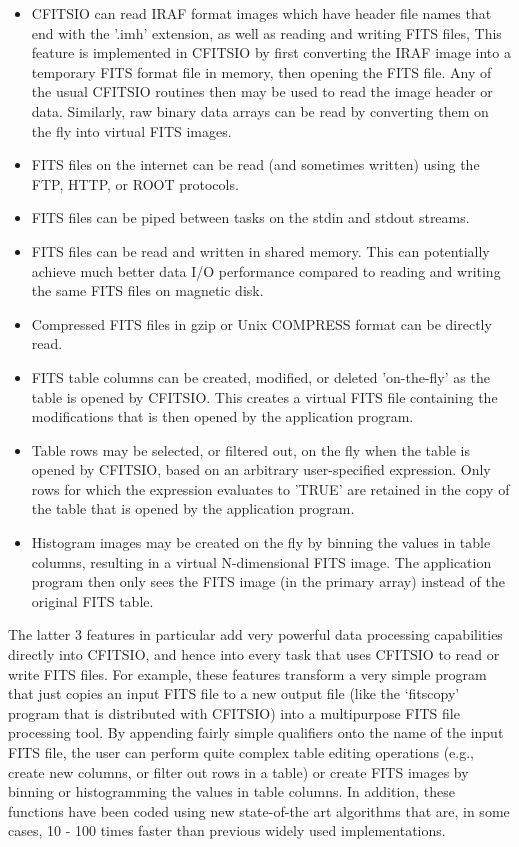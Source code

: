 \documentclass[11pt]{book}
\begin{document}
\begin{itemize}
\item
CFITSIO can read IRAF format images which have header file names that
end with the '.imh' extension, as well as reading and writing FITS
files,   This feature is implemented in CFITSIO by first converting the
IRAF image into a temporary FITS format file in memory, then opening
the FITS file.  Any of the usual CFITSIO routines then may be used to
read the image header or data.  Similarly, raw binary data arrays can
be read by converting them on the fly into virtual FITS images.

\item
FITS files on the internet can be read (and sometimes written) using the FTP,
HTTP, or ROOT protocols.

\item
FITS files can be piped between tasks on the stdin and stdout streams.

\item
FITS files can be read and written in shared memory.  This can potentially
achieve much better data I/O performance compared to reading and
writing the same FITS files on magnetic disk.

\item
Compressed FITS files in gzip or Unix COMPRESS format can be directly read.

\item
FITS table columns can be created, modified, or deleted 'on-the-fly' as
the table is opened by CFITSIO.  This creates a virtual FITS file containing
the modifications that is then opened by the application program.

\item
Table rows may be selected, or filtered out, on the fly when the table
is opened by CFITSIO, based on an arbitrary user-specified expression.
Only rows for which the expression evaluates to 'TRUE' are retained
in the copy of the table that is opened by the application program.

\item
Histogram images may be created on the fly by binning the values in
table columns, resulting in a virtual N-dimensional FITS image.  The
application program then only sees the FITS image (in the primary
array) instead of the original FITS table.
\end{itemize}

The latter 3 features in particular add very powerful data processing
capabilities directly into CFITSIO, and hence into every task that uses
CFITSIO to read or write FITS files.  For example, these features
transform a very simple program that just copies an input FITS file to
a new output file (like the `fitscopy' program that is distributed with
CFITSIO) into a multipurpose FITS file processing tool.  By appending
fairly simple qualifiers onto the name of the input FITS file, the user
can perform quite complex table editing operations (e.g., create new
columns, or filter out rows in a table) or create FITS images by
binning or histogramming the values in table columns.  In addition,
these functions have been coded using new state-of-the art algorithms
that are, in some cases, 10 - 100 times faster than previous widely
used implementations.
\end{document}
